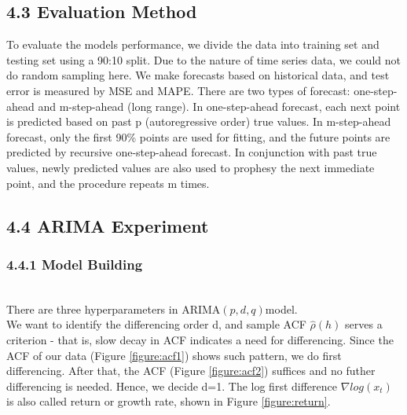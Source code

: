 \documentclass[letterpaper]{article} %
\begin{document}

\subsection{4.3 Evaluation Method}
To evaluate the models performance, we divide the data into training set and testing set using a 90:10 split. Due to the nature of time series data, we could not do random sampling here. We make forecasts based on historical data, and test error is measured by MSE and MAPE. There are two types of forecast: one-step-ahead and m-step-ahead (long range). In one-step-ahead forecast, each next point is predicted based on past p (autoregressive order) true values. In m-step-ahead forecast, only the first 90\% points are used for fitting, and the future points are predicted by recursive one-step-ahead forecast. In conjunction with past true values, newly predicted values are also used to prophesy the next immediate point, and the procedure repeats m times.

\subsection{4.4 ARIMA Experiment}
\subsubsection*{4.4.1 Model Building}~\\
There are three hyperparameters in ARIMA$(p,d,q)$model. \\
We want to identify the differencing order d, and sample ACF $\hat\rho(h)$ serves a criterion - that is, slow decay in ACF indicates a need for differencing. Since the ACF of our data (Figure \ref{figure:acf1}) shows such pattern, we do first differencing. After that, the ACF (Figure \ref{figure:acf2}) suffices and no futher differencing is needed. Hence, we decide d=1. The log first difference $\nabla log(x_t)$ is also called return or growth rate,  shown in Figure \ref{figure:return}.
\end{document}
